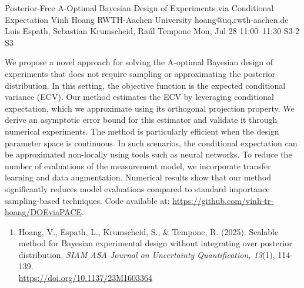 \documentclass[12pt,lettersize,oneside]{book} %
\begin{document}
\begin{talk}
  {Posterior-Free A-Optimal Bayesian Design of Experiments via Conditional Expectation}%
  {Vinh Hoang}%
  {RWTH-Aachen University}%
  {hoang@uq.rwth-aachen.de}%
  {Luis Espath, Sebastian Krumscheid, Ra\'ul Tempone}%
  {}%
  {Mon, Jul 28 11:00--11:30}%
  {S3-2}%
  {S3}%
  
    
   

\medskip

We propose a novel approach for solving the A-optimal Bayesian design of experiments that does not require sampling or approximating the posterior distribution. In this setting, the objective function is the expected conditional variance (ECV).
Our method estimates the ECV by leveraging conditional expectation, which we approximate using its orthogonal projection property. We derive an asymptotic error bound for this estimator and validate it through numerical experiments.
The method is particularly efficient when the design parameter space is continuous. In such scenarios, the conditional expectation can be approximated non-locally using tools such as neural networks. To reduce the number of evaluations of the measurement model, we incorporate transfer learning and data augmentation.
Numerical results show that our method significantly reduces model evaluations compared to standard importance sampling-based techniques.
Code available at: \href{https://github.com/vinh-tr-hoang/DOEviaPACE}{https://github.com/vinh-tr-hoang/DOEviaPACE}.

\begin{enumerate}
    \item [{[1]}] Hoang, V., Espath, L., Krumscheid, S., \& Tempone, R. (2025).  
    Scalable method for Bayesian experimental design without integrating over posterior distribution. {\it SIAM ASA Journal on Uncertainty Quantification, 13}(1), 114-139. \\
    \href{https://doi.org/10.1137/23M1603364}{https://doi.org/10.1137/23M1603364}
\end{enumerate}


\end{talk}
\end{document}
